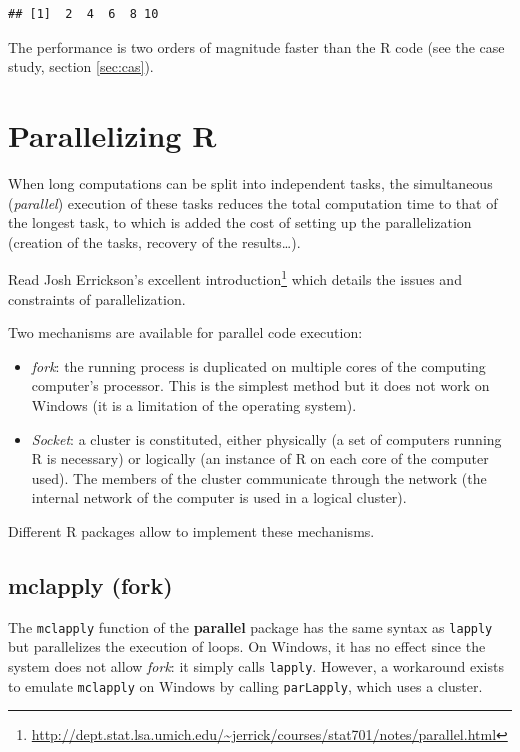 \documentclass[
  12pt,
  american,
  a4paper,
  extrafontsizes,onecolumn,openright
  ]{memoir}
\providecommand{\tightlist}{%
  \setlength{\itemsep}{0pt}\setlength{\parskip}{0pt}}
\newlength{\rf}
\begin{document}
\begin{verbatim}
## [1]  2  4  6  8 10
\end{verbatim}

\normalsize

The performance is two orders of magnitude faster than the R code (see the case study, section \ref{sec:cas}).

\section{Parallelizing R}\label{parallelizing-r}

When long computations can be split into independent tasks, the simultaneous (\emph{parallel}) execution of these tasks reduces the total computation time to that of the longest task, to which is added the cost of setting up the parallelization (creation of the tasks, recovery of the results\ldots).

Read Josh Errickson's excellent introduction\footnote{\url{http://dept.stat.lsa.umich.edu/~jerrick/courses/stat701/notes/parallel.html}} which details the issues and constraints of parallelization.

Two mechanisms are available for parallel code execution:

\begin{itemize}
\tightlist
\item
  \emph{fork}: the running process is duplicated on multiple cores of the computing computer's processor.
  This is the simplest method but it does not work on Windows (it is a limitation of the operating system).
\item
  \emph{Socket}: a cluster is constituted, either physically (a set of computers running R is necessary) or logically (an instance of R on each core of the computer used).
  The members of the cluster communicate through the network (the internal network of the computer is used in a logical cluster).
\end{itemize}

Different R packages allow to implement these mechanisms.

\subsection{mclapply (fork)}\label{mclapply-fork}

The \texttt{mclapply} function of the \textbf{parallel} package has the same syntax as \texttt{lapply} but parallelizes the execution of loops.
On Windows, it has no effect since the system does not allow \emph{fork}: it simply calls \texttt{lapply}.
However, a workaround exists to emulate \texttt{mclapply} on Windows by calling \texttt{parLapply}, which uses a cluster.
\end{document}
